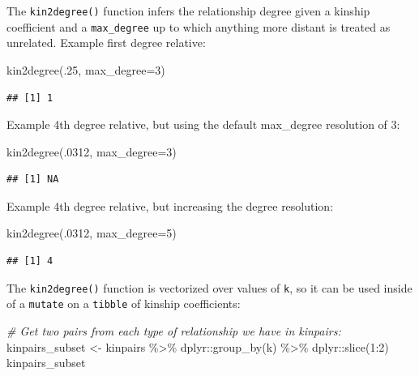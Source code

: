 \documentclass[9pt,a4paper,]{extarticle}
\newenvironment{Shaded}{\begin{snugshade}}{\end{snugshade}}
\newcommand{\AttributeTok}[1]{\textcolor[rgb]{0.77,0.63,0.00}{#1}}
\newcommand{\CommentTok}[1]{\textcolor[rgb]{0.56,0.35,0.01}{\textit{#1}}}
\newcommand{\DecValTok}[1]{\textcolor[rgb]{0.00,0.00,0.81}{#1}}
\newcommand{\FunctionTok}[1]{\textcolor[rgb]{0.00,0.00,0.00}{#1}}
\newcommand{\NormalTok}[1]{#1}
\newcommand{\OtherTok}[1]{\textcolor[rgb]{0.56,0.35,0.01}{#1}}
\newcommand{\SpecialCharTok}[1]{\textcolor[rgb]{0.00,0.00,0.00}{#1}}
\begin{document}
The \texttt{kin2degree()} function infers the relationship degree given a kinship coefficient and a \texttt{max\_degree} up to which anything more distant is treated as unrelated. Example first degree relative:

\begin{Shaded}
\begin{Highlighting}[]
\FunctionTok{kin2degree}\NormalTok{(.}\DecValTok{25}\NormalTok{, }\AttributeTok{max\_degree=}\DecValTok{3}\NormalTok{)}
\end{Highlighting}
\end{Shaded}

\begin{verbatim}
## [1] 1
\end{verbatim}

Example 4th degree relative, but using the default max\_degree resolution of 3:

\begin{Shaded}
\begin{Highlighting}[]
\FunctionTok{kin2degree}\NormalTok{(.}\DecValTok{0312}\NormalTok{, }\AttributeTok{max\_degree=}\DecValTok{3}\NormalTok{)}
\end{Highlighting}
\end{Shaded}

\begin{verbatim}
## [1] NA
\end{verbatim}

Example 4th degree relative, but increasing the degree resolution:

\begin{Shaded}
\begin{Highlighting}[]
\FunctionTok{kin2degree}\NormalTok{(.}\DecValTok{0312}\NormalTok{, }\AttributeTok{max\_degree=}\DecValTok{5}\NormalTok{)}
\end{Highlighting}
\end{Shaded}

\begin{verbatim}
## [1] 4
\end{verbatim}

The \texttt{kin2degree()} function is vectorized over values of \texttt{k}, so it can be used inside of a \texttt{mutate} on a \texttt{tibble} of kinship coefficients:

\begin{Shaded}
\begin{Highlighting}[]
\CommentTok{\# Get two pairs from each type of relationship we have in kinpairs:}
\NormalTok{kinpairs\_subset }\OtherTok{\textless{}{-}} 
\NormalTok{  kinpairs }\SpecialCharTok{\%\textgreater{}\%} 
\NormalTok{  dplyr}\SpecialCharTok{::}\FunctionTok{group\_by}\NormalTok{(k) }\SpecialCharTok{\%\textgreater{}\%} 
\NormalTok{  dplyr}\SpecialCharTok{::}\FunctionTok{slice}\NormalTok{(}\DecValTok{1}\SpecialCharTok{:}\DecValTok{2}\NormalTok{)}
\NormalTok{kinpairs\_subset}
\end{Highlighting}
\end{Shaded}
\end{document}

